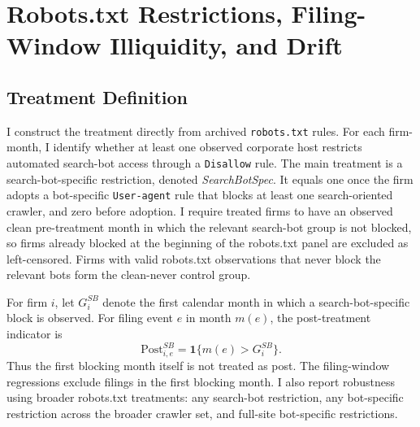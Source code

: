 \section{Robots.txt Restrictions, Filing-Window Illiquidity, and Drift}
\label{sec:robots_txt_illiquidity_drift}

\subsection{Treatment Definition}
\label{subsec:robots_treatment}

I construct the treatment directly from archived \texttt{robots.txt}
rules.  For each firm-month, I identify whether at least one observed
corporate host restricts automated search-bot access through a
\texttt{Disallow} rule.  The main treatment is a search-bot-specific
restriction, denoted \textit{SearchBotSpec}.  It equals one once the firm
adopts a bot-specific \texttt{User-agent} rule that blocks at least one
search-oriented crawler, and zero before adoption.  I require treated
firms to have an observed clean pre-treatment month in which the relevant
search-bot group is not blocked, so firms already blocked at the beginning
of the robots.txt panel are excluded as left-censored.  Firms with valid
robots.txt observations that never block the relevant bots form the
clean-never control group.

For firm \(i\), let \(G_i^{SB}\) denote the first calendar month in which
a search-bot-specific block is observed.  For filing event \(e\) in month
\(m(e)\), the post-treatment indicator is
\[
    \text{Post}^{SB}_{i,e}
    =
    \mathbf{1}\{m(e)>G_i^{SB}\}.
\]
Thus the first blocking month itself is not treated as post.  The
filing-window regressions exclude filings in the first blocking month.
I also report robustness using broader robots.txt treatments: any
search-bot restriction, any bot-specific restriction across the broader
crawler set, and full-site bot-specific restrictions.

